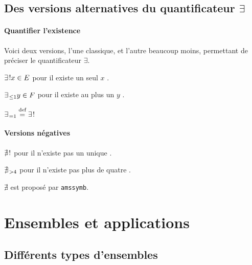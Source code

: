 \documentclass[12pt,a4paper]{article}
\theoremstyle{definition}
\begin{document}

\subsection{\texorpdfstring{Des versions alternatives du quantificateur $\exists$}%
                           {Des versions alternatives du quantificateur existentiel}}
         
\paragraph{Quantifier l'existence}

Voici deux versions, l'une classique, et l'autre beaucoup moins, permettant de préciser le quantificateur $\exists$.

\begin{latexex}
$\exists\kern0.1em ! x \in E$
pour \og il existe un seul $x$ \fg.

$\exists_{\kern0.1em \leq 1} y \in F$
pour \og il existe au plus un $y$ \fg.

$\existmulti{=1} \eqdef \existsone$
\end{latexex}




\paragraph{Versions négatives}

\begin{latexex}
$\nexists\kern0.1em !$
pour \og il n'existe pas un unique \fg.

$\nexists_{\kern0.1em >4}$
pour \og il n'existe pas plus de
quatre \fg.

$\nexists$
est proposé par \verb+amssymb+.
\end{latexex}


\section{Ensembles et applications}

\subsection{Différents types d'ensembles}
\end{document}
